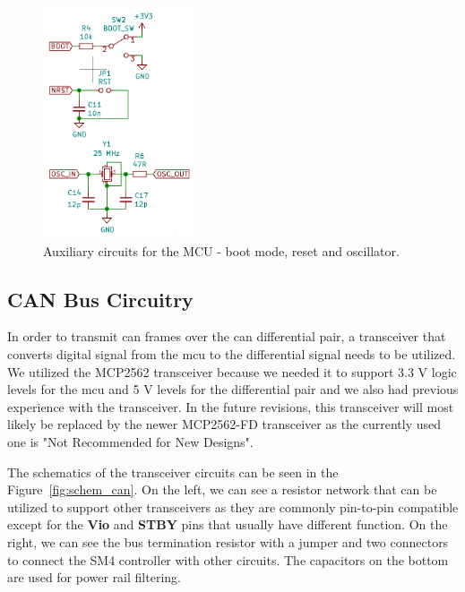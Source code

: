 \begin{figure}[H]
    \centering
    \includegraphics[width=0.4\textwidth]{obrazky/schem_mcu_aux}
    \caption{Auxiliary circuits for the MCU - boot mode, reset and oscillator.}
    \label{fig:schem_mcu_aux}
\end{figure}

\subsection{CAN Bus Circuitry}
\label{subsec:can_circuitry}
In order to transmit \acs{can} frames over the \acs{can} differential pair, a transceiver that converts digital signal from the \acs{mcu} to the differential signal needs to be utilized.
We utilized the MCP2562 transceiver because we needed it to support 3.3 V logic levels for the \acs{mcu} and 5 V levels for the differential pair and we also had previous experience with the transceiver.
In the future revisions, this transceiver will most likely be replaced by the newer MCP2562-FD transceiver as the currently used one is "Not Recommended for New Designs"\cite{microchip_mcp2562_nodate}.

The schematics of the transceiver circuits can be seen in the Figure~\ref{fig:schem_can}.
On the left, we can see a resistor network that can be utilized to support other transceivers as they are commonly pin-to-pin compatible except for the \textbf{Vio} and \textbf{STBY} pins that usually have different function.
On the right, we can see the bus termination resistor with a jumper and two connectors to connect the SM4 controller with other circuits.
The capacitors on the bottom are used for power rail filtering.

